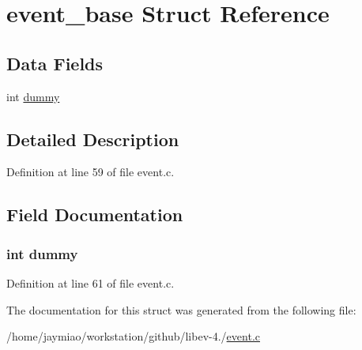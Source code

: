 \hypertarget{structevent__base}{\section{event\-\_\-base \-Struct \-Reference}
\label{structevent__base}
}
\subsection*{\-Data \-Fields}
\begin{DoxyCompactItemize}
\item 
int \hyperlink{structevent__base_a7c1d654b7b6114d7a0abc8d351dd1bcd}{dummy}
\end{DoxyCompactItemize}


\subsection{\-Detailed \-Description}


\-Definition at line 59 of file event.\-c.



\subsection{\-Field \-Documentation}
\hypertarget{structevent__base_a7c1d654b7b6114d7a0abc8d351dd1bcd}{
\subsubsection[{dummy}]{\setlength{\rightskip}{0pt plus 5cm}int {\bf dummy}}}\label{structevent__base_a7c1d654b7b6114d7a0abc8d351dd1bcd}


\-Definition at line 61 of file event.\-c.



\-The documentation for this struct was generated from the following file\-:\begin{DoxyCompactItemize}
\item 
/home/jaymiao/workstation/github/libev-\/4./\hyperlink{event_8c}{event.\-c}\end{DoxyCompactItemize}

